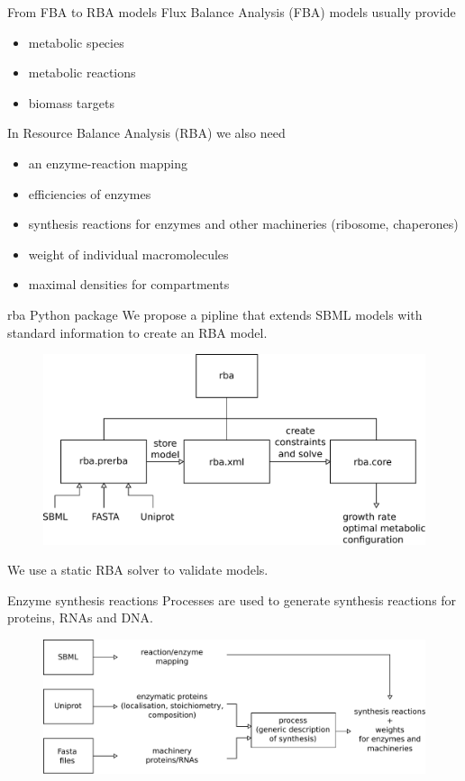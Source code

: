 \documentclass{beamer}
\begin{document}
\begin{frame}{From FBA to RBA models}
  Flux Balance Analysis (FBA) models usually provide
  \begin{itemize}
    \item metabolic species
    \item metabolic reactions
    \item biomass targets
  \end{itemize}

  In Resource Balance Analysis (RBA) we also need
  \begin{itemize}
    \item an enzyme-reaction mapping
    \item efficiencies of enzymes
    \item synthesis reactions for enzymes
    and other machineries (ribosome, chaperones)
    \item weight of individual macromolecules
    \item maximal densities for compartments
  \end{itemize}
\end{frame}

\begin{frame}{rba Python package}
  We propose a pipline that extends SBML models with standard information
  to create an RBA model.
  \begin{figure}
    \centering
    \includegraphics[width=\linewidth]{package_structure}
  \end{figure}
  We use a static RBA solver to validate models.
\end{frame}

\begin{frame}{Enzyme synthesis reactions}
  Processes are used to generate synthesis reactions for proteins, RNAs and DNA.\@
  \begin{figure}
    \centering
    \includegraphics[width=\linewidth]{pipeline_idea}
  \end{figure}
\end{frame}
\end{document}
